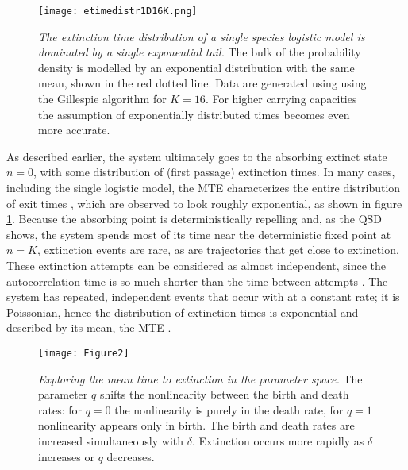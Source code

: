 \begin{figure}[h]
	\centering
	\texttt{[image: etimedistr1D16K.png]}
	\caption{\emph{The extinction time distribution of a single species logistic model is dominated by a single exponential tail.} 
	The bulk of the probability density is modelled by an exponential distribution with the same mean, shown in the red dotted line. 
	Data are generated using using the Gillespie algorithm for $K=16$. For higher carrying capacities the assumption of exponentially distributed times becomes even more accurate. 
	} \label{etimedistr}
\end{figure}

As described earlier, the system ultimately goes to the absorbing extinct state $n=0$, with some distribution of (first passage) extinction times. %
In many cases, including the single logistic model, the MTE characterizes the entire distribution of exit times \cite{Hanggi1990,Bel2010}, which are observed to look roughly exponential, as shown in figure \ref{etimedistr}.  
Because the absorbing point is deterministically repelling and, as the QSD shows, the system spends most of its time near the deterministic fixed point at $n=K$, extinction events are rare, as are trajectories that get close to extinction. 
These extinction attempts can be considered as almost independent, since the autocorrelation time is so much shorter than the time between attempts \cite{Hanggi1990,Lande1993}. %
The system has repeated, independent events that occur with at a constant rate; it is Poissonian, hence the distribution of extinction times is exponential and described by its mean, the MTE \cite{Hanggi1990,Leigh1981,Lande1993,Foley1994}. 

\begin{figure}[h]
	\centering
	\texttt{[image: Figure2]}
	\caption{\emph{Exploring the mean time to extinction in the parameter space.} The parameter $q$ shifts the nonlinearity between the birth and death rates: for $q=0$ the nonlinearity is purely in the death rate, for $q=1$ nonlinearity appears only in birth. The birth and death rates are increased simultaneously with $\delta$. Extinction occurs more rapidly as $\delta$ increases or $q$ decreases. } \label{mteCP}
\end{figure}

